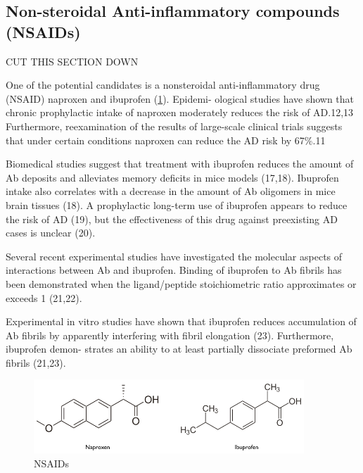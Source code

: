 \subsection{Non-steroidal Anti-inflammatory compounds (NSAIDs)}

CUT THIS SECTION DOWN

One of the potential candidates is a nonsteroidal anti-inflammatory drug (NSAID) naproxen and ibuprofen (\ref{fig:nsaids}).\cite{XXX} Epidemi- ological studies have shown that chronic prophylactic intake of naproxen moderately reduces the risk of AD.12,13 Furthermore, reexamination of the results of large-scale clinical trials suggests that under certain conditions naproxen can reduce the AD risk by 67\%.11

Biomedical studies suggest that treatment with ibuprofen reduces the amount of Ab deposits and alleviates memory deficits in mice models (17,18). Ibuprofen intake also correlates with a decrease in the amount of Ab oligomers in mice brain tissues (18). A prophylactic long-term use of ibuprofen appears to reduce the risk of AD (19), but the effectiveness of this drug against preexisting AD cases is unclear (20). 

Several recent experimental studies have investigated the molecular aspects of interactions between Ab and ibuprofen. Binding of ibuprofen to Ab fibrils has been demonstrated when the ligand/peptide stoichiometric ratio approximates or exceeds 1 (21,22). 

Experimental in vitro studies have shown that ibuprofen reduces accumulation of Ab fibrils by apparently interfering with fibril elongation (23). Furthermore, ibuprofen demon- strates an ability to at least partially dissociate preformed Ab fibrils (21,23).

\begin{figure}
\centering
\includegraphics[width=4in]{figures/introduction/nsaids.png}
\caption[NSAIDs]{NSAIDs}
\label{fig:nsaids}
\end{figure}

